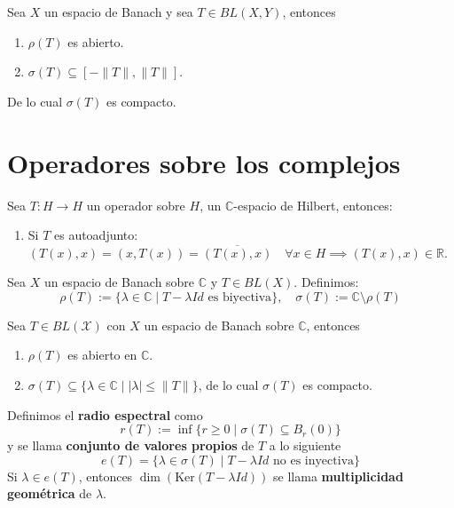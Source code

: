 \documentclass[12pt]{book}
\begin{document}
\begin{teo}
    Sea $X$ un espacio de Banach y sea $T \in BL(X, Y)$, entonces
    \begin{enumerate}
        \item $\rho(T)$ es abierto.
        \item $\sigma(T) \subseteq [-\|T\|, \|T\|]$.
    \end{enumerate}
    De lo cual $\sigma(T)$ es compacto.
\end{teo}


\section{Operadores sobre los complejos}

\noindent 
Sea $T: H \to H$ un operador sobre $H$, un $\mathbb{C}$-espacio de Hilbert, entonces:
\begin{enumerate}
    \item[i)] Si $T$ es autoadjunto: $(T(x), x) = (x, T(x)) = \overline{(T(x), x)} \quad \forall x \in H \implies (T(x), x) \in \mathbb{R}$. \\
\end{enumerate}

\noindent 
Sea $X$ un espacio de Banach sobre $\mathbb{C}$ y $T \in BL(X)$. Definimos:
\[ \rho(T) := \{ \lambda \in \mathbb{C} \mid T - \lambda Id \text{ es biyectiva} \}, \quad \sigma(T) := \mathbb{C} \setminus \rho(T) \]

\begin{prop}
    Sea $T\in BL(\mathcal{X})$ con $X$ un espacio de Banach sobre $\mathbb{C}$, entonces \begin{enumerate}
        \item $\rho(T)$ es abierto en $\mathbb{C}$.
        \item $\sigma(T) \subseteq \{ \lambda \in \mathbb{C} \mid |\lambda| \leq \|T\| \}$, de lo cual $\sigma(T)$ es compacto.
    \end{enumerate}
\end{prop}

\begin{definicion}
    Definimos el \textbf{radio espectral} como  
    $$r(T) := \inf \{ r \geq 0 \mid \sigma(T) \subseteq B_r(0) \}$$
    y se llama \textbf{conjunto de valores propios} de $T$ a lo siguiente
    $$e(T) = \{ \lambda \in \sigma(T) \mid T - \lambda Id \text{ no es inyectiva} \}$$    
    Si $\lambda \in e(T)$, entonces $\dim(\text{Ker}(T - \lambda Id))$ se llama \textbf{multiplicidad geométrica} de $\lambda$.
\end{definicion}
\end{document}
